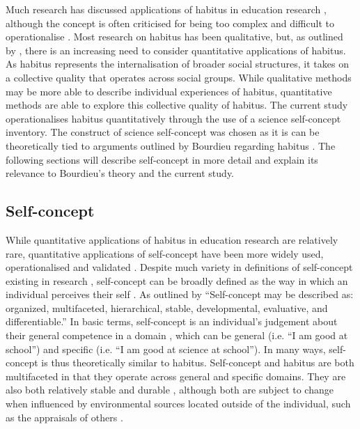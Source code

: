 Much research has discussed applications of habitus in education research \citep{Reay_2004,Nash1999}, although the concept is often criticised for being too complex \citep{goldhaber2000does} and difficult to operationalise \citep{dumais2002cultural}. Most research on habitus has been qualitative, but, as outlined by \cite{mu2014heritage}, there is an increasing need to consider quantitative applications of habitus. As habitus represents the internalisation of broader social structures, it takes on a collective quality that operates across social groups. While qualitative methods may be more able to describe individual experiences of habitus, quantitative methods are able to explore this collective quality of habitus. The current study  operationalises habitus quantitatively through the use of a science self-concept inventory. The construct of science self-concept was chosen as it is can be theoretically tied to arguments outlined by Bourdieu regarding habitus \citep{mu2014heritage,bodovski2014adolescents}. The following sections will describe self-concept in more detail and explain its relevance to Bourdieu's theory and the current study.   

\subsection{Self-concept}
\label{selfconcept}
While quantitative applications of habitus in education research are relatively rare, quantitative applications of self-concept have been more widely used, operationalised and validated \cite[e.g.][]{marsh2014academic,hattie2014self}.   Despite much variety in definitions of self-concept existing in research \citep{shavelson1976self}, self-concept can be broadly defined as the way in which an individual perceives their self \citep{rosenberg1979conceiving,shavelson1976self}.  As outlined by \citet[p.488]{shavelson1976self} ``Self-concept may be described as: organized, multifaceted, hierarchical, stable, developmental, evaluative, and differentiable.'' In basic terms, self-concept is an individual's judgement about their general competence in a domain \citep{jansen2015students}, which can be general (i.e. ``I am good at school'') and specific (i.e. ``I am good at science at school''). In many ways, self-concept is thus theoretically similar to habitus. Self-concept \citep[p.488]{shavelson1976self} and habitus \citep{Nash1999} are both multifaceted in that they operate across general and specific domains. They are also both relatively stable \citep[p.488]{shavelson1976self} and durable \citep{Bourdieu1984}, although both are subject to change when influenced by environmental sources located outside of the individual, such as the appraisals of others \citep{bong2003academic}. 

